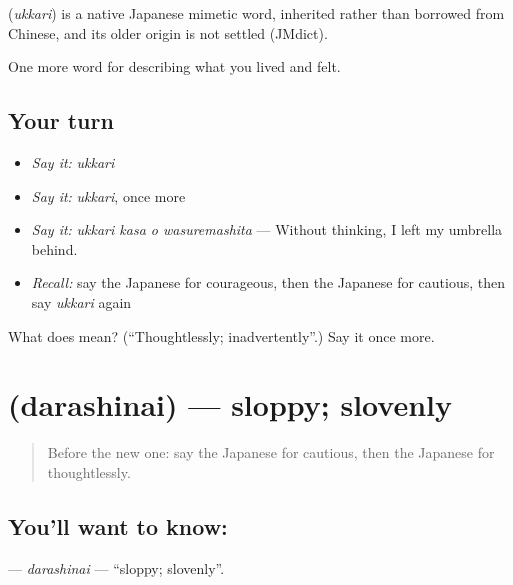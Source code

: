 \begin{cousinweb}
\textbf{} (\emph{ukkari}) is a native Japanese mimetic word, inherited rather than borrowed from Chinese, and its older origin is not settled (JMdict).
\end{cousinweb}

\begin{grammarlens}[title={What you've built}]
One more word for describing what you lived and felt.
\end{grammarlens}

\subsection*{Your turn}
\begin{itemize}
\raggedright
  \item \emph{Say it:} \emph{ukkari}
  \item \emph{Say it:} \emph{ukkari}, once more
  \item \emph{Say it:} \emph{ukkari kasa o wasuremashita} — Without thinking, I left my umbrella behind.
  \item \emph{Recall:} say the Japanese for courageous, then the Japanese for cautious, then say \emph{ukkari} again
\end{itemize}

\begin{tcolorbox}[breakable,colback=teal!4,colframe=teal!35!black,title={Before you move on}]
What does  mean? (\textquotedblleft{}Thoughtlessly; inadvertently\textquotedblright{}.) Say it once more.
\end{tcolorbox}
\section[\texorpdfstring{\ja{だらしない} (darashinai)}{だらしない (darashinai)}]{ (darashinai) — sloppy; slovenly}

\label{lesson:JA-C440-darashinai}



\begin{quote}
Before the new one: say the Japanese for cautious, then the Japanese for thoughtlessly.
\end{quote}

\subsection*{You'll want to know: }
\textbf{} — \emph{darashinai} — \textquotedblleft{}sloppy; slovenly\textquotedblright{}.

